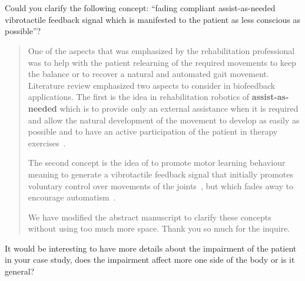 \documentclass[journal,onecolumn,12pt]{IEEEtran}
\begin{document}
\section*{}


Could you clarify the following concept: “fading compliant assist-as-needed vibrotactile feedback signal which is manifested to the patient as less conscious as possible”?

\vspace{10pt} 
\begin{quotation}
{\color{blue}

One of the aspects that was emphasized by the rehabilitation professional was to help with the patient relearning of the required movements to keep the balance or to recover a natural and automated gait movement.  Literature review emphasized two aspects to consider in biofeedback applications.   The first is the idea in rehabilitation robotics of \textbf{assist-as-needed} which is to provide only an external assistance when it is required and allow the natural development of the movement to develop as easily as possible and to have an active participation of the patient in therapy exercises~\cite{Balasubramian.etal2010,Maaref.etal2016}.  

The second concept is the idea of to promote motor learning behaviour meaning to generate a vibrotactile feedback signal that initially promotes voluntary control over movements of the joints~\cite{Islam.etal2022}, but which fades away to encourage automatism~\cite{Srivastava.etal2016,Donato.etal2016}.

We have modified the abstract manuscript to clarify these concepts without using too much more space.  Thank you so much for the inquire.

}
\end{quotation}
\vspace{10pt} 

It would be interesting to have more details about the impairment of the patient in your case study, does the impairment affect more one side of the body or is it general?
\end{document}
